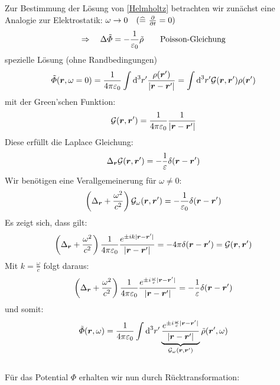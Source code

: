 \noindent
Zur Bestimmung der Lösung von \eqref{Helmholtz} betrachten wir zunächst eine Analogie zur Elektrostatik: $ \omega \to 0 \quad (\widehat{=} \ \frac{\partial }{\partial t} = 0) $
\begin{equation*}
\Rightarrow \quad \Delta \tilde{\varPhi} = - \frac{1}{\varepsilon_0} \tilde{\rho} \qquad \textrm{Poisson-Gleichung}
\end{equation*}
spezielle Lösung (ohne Randbedingungen)
\begin{equation*}
\tilde{\varPhi} (\bm{r},\omega = 0) = \frac{1}{4\pi\varepsilon_0} \int \textrm{d}^3 r' \frac{\rho(\bm{r}')}{| \bm{r} - \bm{r}' |} = \int \textrm{d}^3 r' \mathcal G(\bm{r},\bm{r}') \rho(\bm{r}')
\end{equation*}
mit der Green'schen Funktion:
\begin{equation*}
\mathcal G(\bm{r},\bm{r}') = \frac{1}{4\pi\varepsilon_0} \frac{1}{| \bm{r} - \bm{r}' |}
\end{equation*}
Diese erfüllt die Laplace Gleichung:
\begin{equation*}
\Delta_{\bm{r}} \mathcal G(\bm{r},\bm{r}') = - \frac{1}{\varepsilon} \delta(\bm{r} - \bm{r}')
\end{equation*}
Wir benötigen eine Verallgemeinerung für $ \omega \neq 0 $:
\begin{equation*}
\left(\Delta_{\bm{r}} + \frac{\omega^2}{c^2}\right) \mathcal{G}_{\omega} (\bm{r}, \bm{r}') = - \frac{1}{\varepsilon_0} \delta(\bm{r} - \bm{r}')
\end{equation*}
Es zeigt sich, dass gilt:
\begin{equation*}
\left(\Delta_{\bm{r}} + \frac{\omega^2}{c^2}\right) \frac{1}{4\pi\varepsilon_0} \frac{e^{\pm i k |\bm{r} - \bm{r}'|}}{|\bm{r} - \bm{r}'|} = - 4 \pi \delta(\bm{r} - \bm{r}') = \mathcal G(\bm{r},\bm{r}')
\end{equation*}
Mit $ k = \frac{\omega}{c} $ folgt daraus:
\begin{equation*}
\left(\Delta_{\bm{r}} + \frac{\omega^2}{c^2}\right) \frac{1}{4\pi\varepsilon_0} \frac{e^{\pm i \frac{\omega}{c} |\bm{r} - \bm{r}'|}}{|\bm{r} - \bm{r}'|} = - \frac{1}{\varepsilon} \delta(\bm{r} - \bm{r}')
\end{equation*}
und somit:
\begin{equation*}
\tilde{\varPhi} (\bm{r},\omega) = \frac{1}{4\pi\varepsilon_0} \int \textrm{d}^3 r' \underbrace{\frac{e^{\pm i \frac{\omega}{c} |\bm{r} - \bm{r}'|}}{|\bm{r} - \bm{r}'|}}_{\mathcal{G}_{\omega} (\bm{r},\bm{r}')} \tilde{\rho}(\bm{r}',\omega)
\end{equation*}
\\[5pt]
Für das Potential $ \Phi $ erhalten wir nun durch Rücktransformation:
